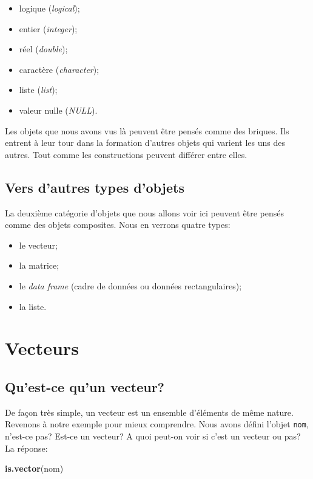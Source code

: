 \documentclass[]{book}
\newenvironment{Shaded}{\begin{snugshade}}{\end{snugshade}}
\newcommand{\KeywordTok}[1]{\textcolor[rgb]{0.13,0.29,0.53}{\textbf{#1}}}
\newcommand{\NormalTok}[1]{#1}
\begin{document}
\begin{itemize}
\item
  logique (\emph{logical});
\item
  entier (\emph{integer});
\item
  réel (\emph{double});
\item
  caractère (\emph{character});
\item
  liste (\emph{list});
\item
  valeur nulle (\emph{NULL}).
\end{itemize}

Les objets que nous avons vus là peuvent être pensés comme des briques.
Ils entrent à leur tour dans la formation d'autres objets qui varient
les uns des autres. Tout comme les constructions peuvent différer entre
elles.

\subsection{Vers d'autres types
d'objets}\label{vers-dautres-types-dobjets}

La deuxième catégorie d'objets que nous allons voir ici peuvent être
pensés comme des objets composites. Nous en verrons quatre types:

\begin{itemize}
\item
  le vecteur;
\item
  la matrice;
\item
  le \emph{data frame} (cadre de données ou données rectangulaires);
\item
  la liste.
\end{itemize}

\section{Vecteurs}\label{vecteurs}

\subsection{Qu'est-ce qu'un vecteur?}\label{quest-ce-quun-vecteur}

De façon très simple, un vecteur est un ensemble d'éléments de même
nature. Revenons à notre exemple pour mieux comprendre. Nous avons
défini l'objet \texttt{nom}, n'est-ce pas? Est-ce un vecteur? A quoi
peut-on voir si c'est un vecteur ou pas? La réponse:

\begin{Shaded}
\begin{Highlighting}[]
\KeywordTok{is.vector}\NormalTok{(nom)}
\end{Highlighting}
\end{Shaded}
\end{document}
